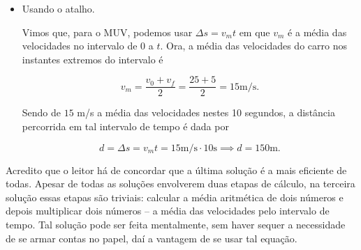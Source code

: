 \begin{exemplo}[Nível I]
\begin{itemize}
    $$v^2=v_0^2+2a\Delta s \implies 25^2=5^2+2 \cdot 2 \cdot \Delta s \implies \boxed{\Delta s = 150 \text{m}.}$$

    \item [(iii)] Usando o atalho.

    Vimos que, para o MUV, podemos usar $\Delta s=v_m t$ em que $v_m$ é a média das velocidades no intervalo de $0$ a $t$. Ora, a média das velocidades do carro nos instantes extremos do intervalo é

    $$ v_m = \dfrac{v_0+v_f}{2}=\dfrac{25+5}{2}=15 \text{m/s.}$$

    Sendo de $15$ m/s a média das velocidades nestes 10 segundos, a distância percorrida em tal intervalo de tempo é dada por


    $$ d=\Delta s=v_mt=15 \text{m/s}\cdot 10 \text{s} \implies \boxed{d=150 \text{m}.}$$
    
\end{itemize}


    Acredito que o leitor há de concordar que a última solução é a mais eficiente de todas. Apesar de todas as soluções envolverem duas etapas de cálculo, na terceira solução essas etapas são triviais: calcular a média aritmética de dois números e depois multiplicar dois números -- a média das velocidades pelo intervalo de tempo. Tal solução pode ser feita mentalmente, sem haver sequer a necessidade de se armar contas no papel, daí a vantagem de se usar tal equação.

\end{exemplo}

\vspace{0.3cm}







